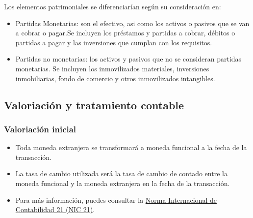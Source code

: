 \documentclass[a4paper,12pt]{article}
\begin{document}
Los elementos patrimoniales se diferenciarían según su consideración en:
\begin{itemize}
    \item Partidas Monetarias: son el efectivo, asi como los activos o pasivos que se van a cobrar o pagar.Se incluyen los préstamos y partidas a cobrar, débitos o partidas a pagar y las inversiones que cumplan con los requisitos.
    \item Partidas no monetarias: los activos y pasivos que no se consideran partidas monetarias. Se incluyen los inmovilizados materiales, inversiones inmobiliarias, fondo de comercio y otros inmovilizados intangibles.
\end{itemize}

\subsection{Valoriación y tratamiento contable}

\subsubsection{Valoriación inicial}
\begin{itemize}
    \item Toda moneda extranjera se transformará a moneda funcional a la fecha de la transacción.
    \item La tasa de cambio utilizada será la tasa de cambio de contado entre la moneda funcional y la moneda extranjera en la fecha de la transacción.
    \item Para más información, puedes consultar la \href{https://www.ifrs.org/issued-standards/list-of-standards/ias-21-the-effects-of-changes-in-foreign-exchange-rates/}{Norma Internacional de Contabilidad 21 (NIC 21)}.
\end{itemize}
\end{document}
